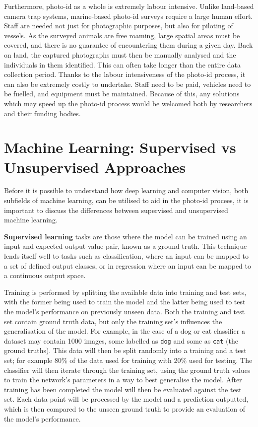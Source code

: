 Furthermore, photo-id as a whole is extremely labour intensive. Unlike land-based camera trap systems, marine-based photo-id surveys require a large human effort. Staff are needed not just for photographic purposes, but also for piloting of vessels. As the surveyed animals are free roaming, large spatial areas must be covered, and there is no guarantee of encountering them during a given day. Back on land, the captured photographs must then be manually analysed and the individuals in them identified. This can often take longer than the entire data collection period. Thanks to the labour intensiveness of the photo-id process, it can also be extremely costly to undertake. Staff need to be paid, vehicles need to be fuelled, and equipment must be maintained. Because of this, any solutions which may speed up the photo-id process would be welcomed both by researchers and their funding bodies. 

\section{Machine Learning: Supervised vs Unsupervised Approaches}\label{ch:Background,sec:DLIntro,sub:supervisedVsUnsupervisedLearning}

Before it is possible to understand how deep learning and computer vision, both subfields of machine learning, can be utilised to aid in the photo-id procees, it is important to discuss the differences between supervised and unsupervised machine learning.

\textbf{Supervised learning} tasks are those where the model can be trained using an input and expected output value pair, known as a ground truth. This technique lends itself well to tasks such as classification, where an input can be mapped to a set of defined output classes, or in regression where an input can be mapped to a continuous output space. 

Training is performed by splitting the available data into training and test sets, with the former being used to train the model and the latter being used to test the model's performance on previously unseen data. Both the training and test set contain ground truth data, but only the training set's influences the generalisation of the model. For example, in the case of a dog or cat classifier a dataset may contain 1000 images, some labelled as \texttt{dog} and some as \texttt{cat} (the ground truths). This data will then be split randomly into a training and a test set; for example 80\% of the data used for training with 20\% used for testing. The classifier will then iterate through the training set, using the ground truth values to train the network's parameters in a way to best generalise the model. After training has been completed the model will then be evaluated against the test set. Each data point will be processed by the model and a prediction outputted, which is then compared to the unseen ground truth to provide an evaluation of the model's performance.

